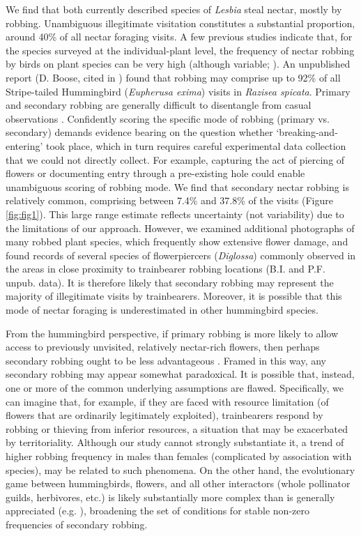 \documentclass[fleqn,10pt,lineno]{wlpeerj}
\begin{document}
%
%
We find that both currently described species of \textit{Lesbia} steal nectar, mostly by robbing. 
Unambiguous illegitimate visitation constitutes a substantial proportion, around 40\% of all nectar foraging visits. 
A few previous studies indicate that, for the species surveyed at the individual-plant level, the frequency of nectar robbing by birds on plant species can be very high (although variable; \citealt{arizmendi2001}). 
An unpublished report (D. Boose, cited in \citealt{maloof2000}) found that robbing may comprise up to 92\% of all Stripe-tailed Hummingbird (\textit{Eupherusa exima}) visits in \textit{Razisea spicata}.
Primary and secondary robbing are generally difficult to disentangle from casual observations \citep{vogt2006,boehm2018}. 
Confidently scoring the specific mode of robbing (primary vs. secondary) demands evidence bearing on the question whether `breaking-and-entering' took place, which  in turn requires careful experimental data collection that we could not directly collect.
For example, capturing the act of piercing of flowers or documenting entry through a pre-existing hole could enable unambiguous scoring of robbing mode.
We find that secondary nectar robbing is relatively common, comprising between 7.4\% and 37.8\% of the visits (Figure \ref{fig:fig1}).
This large range estimate reflects uncertainty (not variability) due to the limitations of our approach.
However, we examined additional photographs of many robbed plant species, which frequently show extensive flower damage, and found records of several species of flowerpiercers (\textit{Diglossa}) commonly observed in the areas in close proximity to trainbearer robbing locations (B.I. and P.F. unpub. data).
It is therefore likely that secondary robbing may represent the majority of illegitimate visits by trainbearers. Moreover, it is possible that this mode of nectar foraging is underestimated  in other hummingbird species.

%
%
From the hummingbird perspective, if primary robbing is more likely to allow access to previously unvisited, relatively nectar-rich flowers, then perhaps secondary robbing ought to be less advantageous \citep{irwin2010}.  
Framed in this way, any secondary robbing may appear somewhat paradoxical. 
It is possible that, instead, one or more of the common underlying assumptions are flawed. 
Specifically, we can imagine that, for example, if they are faced with resource limitation (of flowers that are ordinarily legitimately exploited), trainbearers respond by robbing or thieving from inferior resources, a situation that may be exacerbated by territoriality. 
Although our study cannot strongly substantiate it, a trend of higher robbing frequency in males than females (complicated by association with species), may be related to such phenomena.
On the other hand, the evolutionary game between hummingbirds, flowers, and all other interactors (whole pollinator guilds, herbivores, etc.) is likely substantially more complex than is generally appreciated (e.g. \citealt{maloof2000}), broadening the set of conditions for stable non-zero frequencies of secondary robbing.
\end{document}
